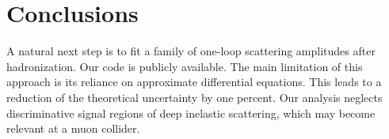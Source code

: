 \section{Conclusions}\label{sec:conclusions}

A natural next step is to fit a family of one-loop scattering amplitudes
after hadronization. Our code is publicly available. The main limitation
of this approach is its reliance on approximate differential equations.
This leads to a reduction of the theoretical uncertainty by one percent.
Our analysis neglects discriminative signal regions of deep inelastic
scattering, which may become relevant at a muon collider.

